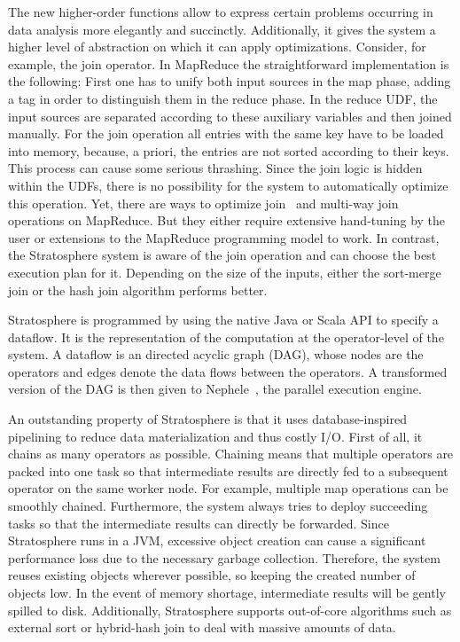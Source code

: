 The new higher-order functions allow to express certain problems occurring in data analysis more elegantly and succinctly.
Additionally, it gives the system a higher level of abstraction on which it can apply optimizations.
Consider, for example, the join operator.
In MapReduce the straightforward implementation is the following:
First one has to unify both input sources in the map phase, adding a tag in order to distinguish them in the reduce phase.
In the reduce UDF, the input sources are separated according to these auxiliary variables and then joined manually.
For the join operation all entries with the same key have to be loaded into memory, because, a priori, the entries are not sorted according to their keys.
This process can cause some serious thrashing.
Since the join logic is hidden within the UDFs, there is no possibility for the system to automatically optimize this operation.
Yet, there are ways to optimize join~\cite{blanas:2010a} and multi-way join~\cite{afrati:2010a} operations on MapReduce.
But they either require extensive hand-tuning by the user or extensions to the MapReduce programming model to work.
In contrast, the Stratosphere system is aware of the join operation and can choose the best execution plan for it.
Depending on the size of the inputs, either the sort-merge join or the hash join algorithm performs better.

Stratosphere is programmed by using the native Java or Scala API to specify a dataflow.
It is the representation of the computation at the operator-level of the system.
A dataflow is an directed acyclic graph (DAG), whose nodes are the operators and edges denote the data flows between the operators.
A transformed version of the DAG is then given to Nephele~\cite{warneke:2009a}, the parallel execution engine.

An outstanding property of Stratosphere is that it uses database-inspired pipelining to reduce data materialization and thus costly I/O.
First of all, it chains as many operators as possible.
Chaining means that multiple operators are packed into one task so that intermediate results are directly fed to a subsequent operator on the same worker node.
For example, multiple map operations can be smoothly chained.
Furthermore, the system always tries to deploy succeeding tasks so that the intermediate results can directly be forwarded.
Since Stratosphere runs in a JVM, excessive object creation can cause a significant performance loss due to the necessary garbage collection.
Therefore, the system reuses existing objects wherever possible, so keeping the created number of objects low.
In the event of memory shortage, intermediate results will be gently spilled to disk.
Additionally, Stratosphere supports out-of-core algorithms such as external sort or hybrid-hash join to deal with massive amounts of data.

